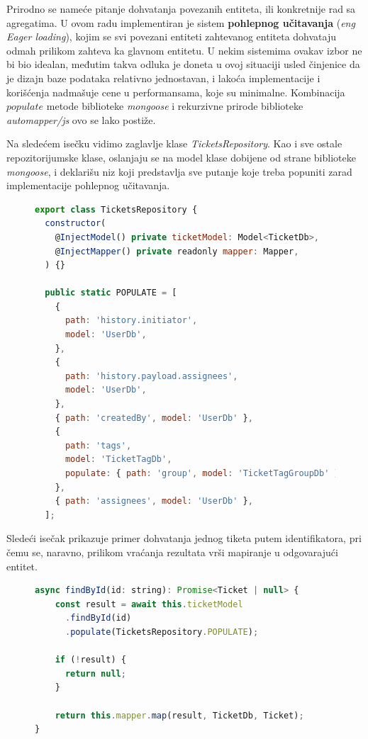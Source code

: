 \documentclass[12pt,oneside]{memoir}
\begin{document}
Prirodno se nameće pitanje dohvatanja povezanih entiteta, ili konkretnije rad sa agregatima. U ovom radu implementiran je sistem \textbf{pohlepnog učitavanja} (\textit{eng Eager loading}), kojim se svi povezani entiteti zahtevanog entiteta dohvataju odmah prilikom zahteva ka glavnom entitetu. U nekim sistemima ovakav izbor ne bi bio idealan, međutim takva odluka je doneta u ovoj situaciji usled činjenice da je dizajn baze podataka relativno jednostavan, i lakoća implementacije i korišćenja nadmašuje cene u performansama, koje su minimalne. Kombinacija $populate$ metode biblioteke \textit{mongoose} i rekurzivne prirode biblioteke \textit{automapper/js} ovo se lako postiže.

Na sledećem isečku vidimo zaglavlje klase \textit{TicketsRepository}. Kao i sve ostale repozitorijumske klase, oslanjaju se na model klase dobijene od strane biblioteke \textit{mongoose}, i deklarišu niz koji predstavlja sve putanje koje treba popuniti zarad implementacije pohlepnog učitavanja.

\begin{figure}[h]
\begin{lstlisting}[language=JavaScript, style=ES6, caption={Fajl \textit{tickets.repository.ts}, konstrukcija i niz POPULATE}]
export class TicketsRepository {
  constructor(
    @InjectModel() private ticketModel: Model<TicketDb>,
    @InjectMapper() private readonly mapper: Mapper,
  ) {}

  public static POPULATE = [
    {
      path: 'history.initiator',
      model: 'UserDb',
    },
    {
      path: 'history.payload.assignees',
      model: 'UserDb',
    },
    { path: 'createdBy', model: 'UserDb' },
    {
      path: 'tags',
      model: 'TicketTagDb',
      populate: { path: 'group', model: 'TicketTagGroupDb' },
    },
    { path: 'assignees', model: 'UserDb' },
  ];
\end{lstlisting}
\end{figure}

\newpage
Sledeći isečak prikazuje primer dohvatanja jednog tiketa putem identifikatora, pri čemu se, naravno, prilikom vraćanja rezultata vrši mapiranje u odgovarajući entitet.

\begin{figure}[h]
\begin{lstlisting}[language=JavaScript, style=ES6, caption={Fajl \textit{tickets.repository.ts}, dohvatanje entiteta}]
async findById(id: string): Promise<Ticket | null> {
    const result = await this.ticketModel
      .findById(id)
      .populate(TicketsRepository.POPULATE);
    
    if (!result) {
      return null;
    }
    
    return this.mapper.map(result, TicketDb, Ticket);
}
\end{lstlisting}
\end{figure}
\end{document}
